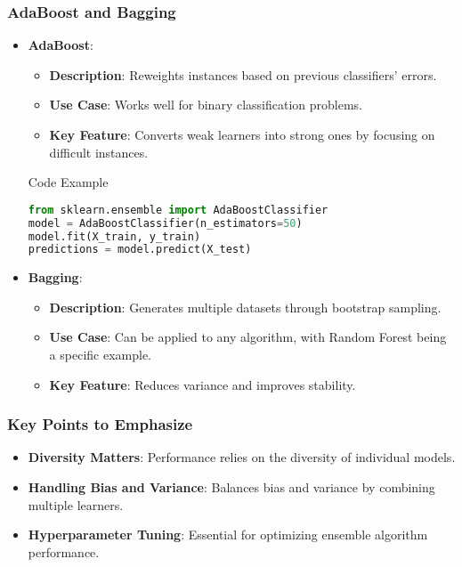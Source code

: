 \documentclass[aspectratio=169]{beamer}
\begin{document}
\begin{frame}[fragile]
    \frametitle{AdaBoost and Bagging}
    \begin{itemize}
        \item \textbf{AdaBoost}:
        \begin{itemize}
            \item \textbf{Description}: Reweights instances based on previous classifiers' errors.
            \item \textbf{Use Case}: Works well for binary classification problems.
            \item \textbf{Key Feature}: Converts weak learners into strong ones by focusing on difficult instances.
        \end{itemize}
        \begin{block}{Code Example}
            \begin{lstlisting}[language=Python]
from sklearn.ensemble import AdaBoostClassifier
model = AdaBoostClassifier(n_estimators=50)
model.fit(X_train, y_train)
predictions = model.predict(X_test)
            \end{lstlisting}
        \end{block}
        
        \item \textbf{Bagging}:
        \begin{itemize}
            \item \textbf{Description}: Generates multiple datasets through bootstrap sampling.
            \item \textbf{Use Case}: Can be applied to any algorithm, with Random Forest being a specific example.
            \item \textbf{Key Feature}: Reduces variance and improves stability.
        \end{itemize}
    \end{itemize}
\end{frame}

\begin{frame}
    \frametitle{Key Points to Emphasize}
    \begin{itemize}
        \item \textbf{Diversity Matters}: Performance relies on the diversity of individual models.
        \item \textbf{Handling Bias and Variance}: Balances bias and variance by combining multiple learners.
        \item \textbf{Hyperparameter Tuning}: Essential for optimizing ensemble algorithm performance.
    \end{itemize}
\end{frame}
\end{document}
